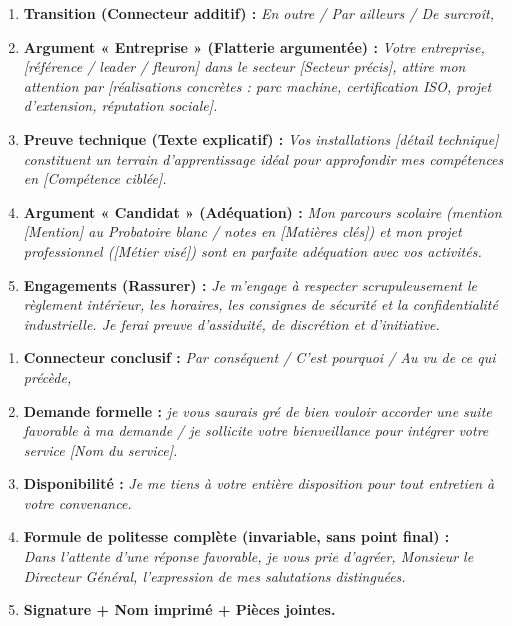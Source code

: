\documentclass[11pt]{article}
\begin{document}
\begin{methode}
\begin{enumerate}
    \item \textbf{Transition (Connecteur additif) :} \emph{En outre / Par ailleurs / De surcroît,}
    \item \textbf{Argument « Entreprise » (Flatterie argumentée) :} \emph{Votre entreprise, [référence / leader / fleuron] dans le secteur [Secteur précis], attire mon attention par [réalisations concrètes : parc machine, certification ISO, projet d'extension, réputation sociale].}
    \item \textbf{Preuve technique (Texte explicatif) :} \emph{Vos installations [détail technique] constituent un terrain d'apprentissage idéal pour approfondir mes compétences en [Compétence ciblée].}
    \item \textbf{Argument « Candidat » (Adéquation) :} \emph{Mon parcours scolaire (mention [Mention] au Probatoire blanc / notes en [Matières clés]) et mon projet professionnel ([Métier visé]) sont en parfaite adéquation avec vos activités.}
    \item \textbf{Engagements (Rassurer) :} \emph{Je m'engage à respecter scrupuleusement le règlement intérieur, les horaires, les consignes de sécurité et la confidentialité industrielle. Je ferai preuve d'assiduité, de discrétion et d'initiative.}
\end{enumerate}
\end{methode}

\begin{methode}
\begin{enumerate}
    \item \textbf{Connecteur conclusif :} \emph{Par conséquent / C'est pourquoi / Au vu de ce qui précède,}
    \item \textbf{Demande formelle :} \emph{je vous saurais gré de bien vouloir accorder une suite favorable à ma demande / je sollicite votre bienveillance pour intégrer votre service [Nom du service].}
    \item \textbf{Disponibilité :} \emph{Je me tiens à votre entière disposition pour tout entretien à votre convenance.}
    \item \textbf{Formule de politesse complète (invariable, sans point final) :} \\
    \emph{Dans l'attente d'une réponse favorable, je vous prie d'agréer, Monsieur le Directeur Général, l'expression de mes salutations distinguées.}
    \item \textbf{Signature + Nom imprimé + Pièces jointes.}
\end{enumerate}
\end{methode}
\end{document}
